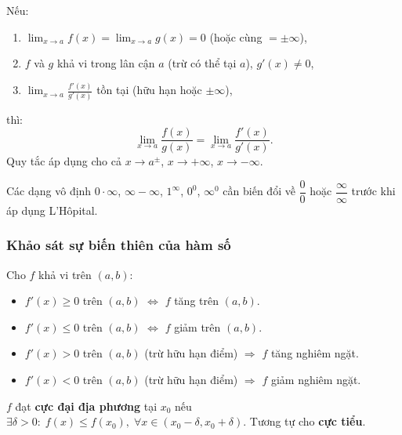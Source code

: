 \documentclass[12pt,a4paper]{article}
\begin{document}
\begin{dinhly}[title={Quy tắc L'Hôpital}]
  Nếu:
  \begin{enumerate}
    \item $\displaystyle\lim_{x \to a} f(x) = \lim_{x \to a} g(x) = 0$ \;(hoặc cùng $= \pm\infty$),
    \item $f$ và $g$ khả vi trong lân cận $a$ (trừ có thể tại $a$), $g'(x) \ne 0$,
    \item $\displaystyle\lim_{x \to a} \frac{f'(x)}{g'(x)}$ tồn tại (hữu hạn hoặc $\pm\infty$),
  \end{enumerate}
  thì:
  \[
    \lim_{x \to a} \frac{f(x)}{g(x)} = \lim_{x \to a} \frac{f'(x)}{g'(x)}.
  \]
  Quy tắc áp dụng cho cả $x \to a^{\pm}$, $x \to +\infty$, $x \to -\infty$.
\end{dinhly}

\begin{luuy}
  Các dạng vô định $0 \cdot \infty$, $\infty - \infty$, $1^\infty$, $0^0$, $\infty^0$ cần biến đổi về $\dfrac{0}{0}$ hoặc $\dfrac{\infty}{\infty}$ trước khi áp dụng L'Hôpital.
\end{luuy}

\subsubsection{Khảo sát sự biến thiên của hàm số}

\begin{dinhly}[title={Điều kiện đơn điệu}]
  Cho $f$ khả vi trên $(a,b)$:
  \begin{itemize}
    \item $f'(x) \ge 0$ trên $(a,b)$ $\Leftrightarrow$ $f$ tăng trên $(a,b)$.
    \item $f'(x) \le 0$ trên $(a,b)$ $\Leftrightarrow$ $f$ giảm trên $(a,b)$.
    \item $f'(x) > 0$ trên $(a,b)$ (trừ hữu hạn điểm) $\Rightarrow$ $f$ tăng nghiêm ngặt.
    \item $f'(x) < 0$ trên $(a,b)$ (trừ hữu hạn điểm) $\Rightarrow$ $f$ giảm nghiêm ngặt.
  \end{itemize}
\end{dinhly}

\begin{dinhnghia}[title={Cực trị}]
  $f$ đạt \textbf{cực đại địa phương} tại $x_0$ nếu $\exists \delta > 0:\; f(x) \le f(x_0),\;\forall x \in (x_0 - \delta, x_0 + \delta)$. Tương tự cho \textbf{cực tiểu}.
\end{dinhnghia}
\end{document}
